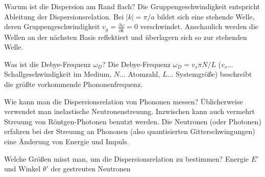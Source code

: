 \begin{fquestion}{Warum ist die Dispersion am Rand flach? }
    Die Gruppengeschwindigkeit entspricht Ableitung der Dispersionsrelation.
    Bei \(|k| = \pi/a\) bildet sich eine stehende Welle, deren Gruppengeschwindigkeit \( v_g = \frac{\partial \omega}{\partial k} = 0\) verschwindet.
    Anschaulich werden die Wellen an der nächsten Basis reflektiert und überlagern sich so zur stehenden Welle.
\end{fquestion}

\begin{fquestion}{Was ist die Debye-Frequenz $\omega_D$?}
    Die Debye-Frequenz $\omega_D = v_s \pi N / L$ ($v_s\ldots$ Schallgeschwindigkeit im Medium, $N\ldots$ Atomzahl, $L\ldots$ Systemgröße) beschreibt die größte vorkommende Phononenfrequenz.
\end{fquestion}

\begin{fquestion}{Wie kann man die Dispersionsrelation von Phononen messen?}
    Üblicherweise verwendet man inelastische Neutronenstreuung.
    Inzwischen kann auch vermehrt Streuung von Röntgen-Photonen benutzt werden.  
    Die Neutronen (oder Photonen) erfahren bei der Streuung an Phononen (also quantisierten Gitterschwingungen) eine Änderung von Energie und Impuls. 
\end{fquestion}

\begin{fquestion}{Welche Größen misst man, um die Dispersionsrelation zu bestimmen?}
    Energie $E'$ und Winkel $\theta'$ der gestreuten Neutronen
\end{fquestion}

